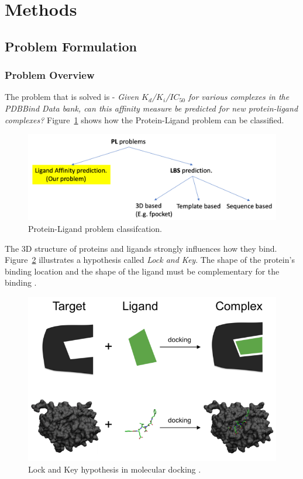 \documentclass[11pt]{article}
\begin{document}
\section{Methods}
\subsection{Problem Formulation}
\subsubsection{Problem Overview}
\label{ProblemOverviewlabel}
The problem that is solved is - \textit{Given $K_d$/$K_i$/$IC_{50}$ for various complexes in the PDBBind Data bank,
can this affinity measure be predicted for new protein-ligand complexes?}
Figure~\ref{fig:plproblemclassification} shows how the Protein-Ligand problem can be classified.

\begin{figure}[htb]
  \centering
    \includegraphics[scale=0.35]{images/pl_problem_classification}
    \caption{Protein-Ligand problem classifcation.}
    \label{fig:plproblemclassification}
\end{figure}

The 3D structure of proteins and ligands strongly influences how they bind.
Figure~\ref{fig:lockandkey} illustrates a hypothesis called \textit{Lock and Key}.
The shape of the protein's binding location and the shape of the ligand must be complementary for the binding \cite{proteinlingandbindingpaper}.

\begin{figure}[htb]
  \centering
    \includegraphics[scale=0.7]{images/lock_and_key}
    \caption{Lock and Key hypothesis in molecular docking \cite{lockandkeyformatpng}.}
    \label{fig:lockandkey}
\end{figure}
\end{document}
